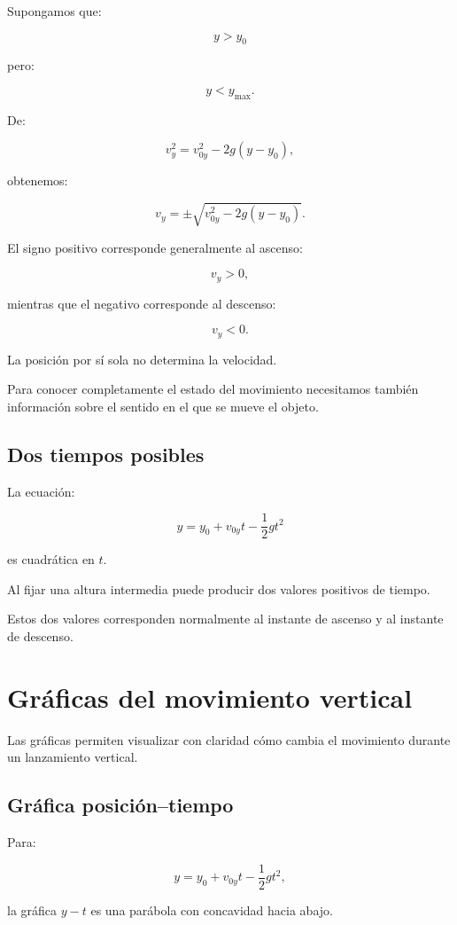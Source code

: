 Supongamos que:

\[ y>y_0 \]

pero:

\[ y<y_{\max}. \]

De:

\[ v_y^2=v_{0y}^2-2g(y-y_0), \]

obtenemos:

\[ v_y=\pm\sqrt{v_{0y}^2-2g(y-y_0)}. \]

El signo positivo corresponde generalmente al ascenso:

\[ v_y>0, \]

mientras que el negativo corresponde al descenso:

\[ v_y<0. \]

\begin{interpretacion}
La posición por sí sola no determina la velocidad.

Para conocer completamente el estado del movimiento necesitamos también información sobre el sentido en el que se mueve el objeto.
\end{interpretacion}


\subsection{Dos tiempos posibles}

La ecuación:

\[ y=y_0+v_{0y}t-\frac{1}{2}gt^2 \]

es cuadrática en \(t\).

Al fijar una altura intermedia puede producir dos valores positivos de tiempo.

Estos dos valores corresponden normalmente al instante de ascenso y al instante de descenso.


\section{Gráficas del movimiento vertical}

Las gráficas permiten visualizar con claridad cómo cambia el movimiento durante un lanzamiento vertical.


\subsection{Gráfica posición--tiempo}

Para:

\[ y=y_0+v_{0y}t-\frac{1}{2}gt^2, \]

la gráfica \(y-t\) es una parábola con concavidad hacia abajo.

